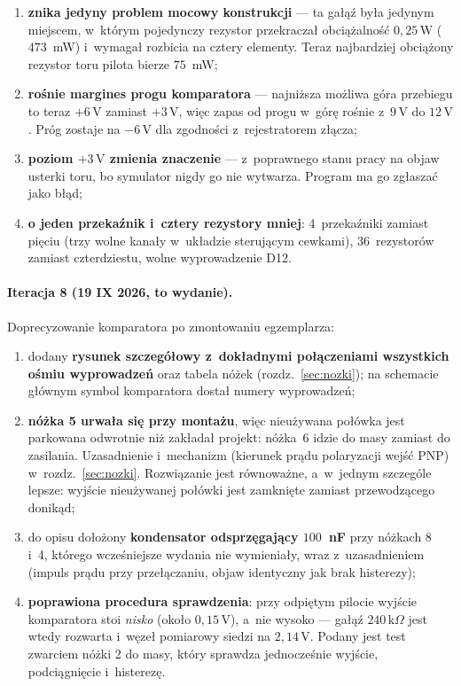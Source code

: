\documentclass[a4paper,11pt]{article}
\newcommand{\kohm}{\,\mathrm{k}\Omega}
\newcommand{\volt}{\,\mathrm{V}}
\newcommand{\watt}{\,\mathrm{W}}
\begin{document}
\begin{enumerate}
\item \textbf{znika jedyny problem mocowy konstrukcji} --- ta gałąź była jedynym
      miejscem, w~którym pojedynczy rezystor przekraczał obciążalność
      $0{,}25\watt$ ($473$~mW) i~wymagał rozbicia na cztery elementy. Teraz
      najbardziej obciążony rezystor toru pilota bierze $75$~mW;
\item \textbf{rośnie margines progu komparatora} --- najniższa możliwa góra
      przebiegu to teraz $+6\volt$ zamiast $+3\volt$, więc zapas od progu w~górę
      rośnie z~$9\volt$ do $12\volt$. Próg zostaje na $-6\volt$ dla zgodności
      z~rejestratorem złącza;
\item \textbf{poziom $+3\volt$ zmienia znaczenie} --- z~poprawnego stanu pracy na
      objaw usterki toru, bo symulator nigdy go nie wytwarza. Program ma go zgłaszać
      jako błąd;
\item \textbf{o jeden przekaźnik i~cztery rezystory mniej}: 4~przekaźniki zamiast
      pięciu (trzy wolne kanały w~układzie sterującym cewkami), 36~rezystorów
      zamiast czterdziestu, wolne wyprowadzenie D12.
\end{enumerate}

\paragraph{Iteracja 8 (19 IX 2026, to wydanie).} Doprecyzowanie komparatora po
zmontowaniu egzemplarza:

\begin{enumerate}
\item dodany \textbf{rysunek szczegółowy z~dokładnymi połączeniami wszystkich ośmiu
      wyprowadzeń} oraz tabela nóżek (rozdz.~\ref{sec:nozki}); na schemacie głównym
      symbol komparatora dostał numery wyprowadzeń;
\item \textbf{nóżka 5 urwała się przy montażu}, więc nieużywana połówka jest parkowana
      odwrotnie niż zakładał projekt: nóżka~6 idzie do masy zamiast do zasilania.
      Uzasadnienie i~mechanizm (kierunek prądu polaryzacji wejść PNP)
      w~rozdz.~\ref{sec:nozki}. Rozwiązanie jest równoważne, a~w~jednym szczególe
      lepsze: wyjście nieużywanej połówki jest zamknięte zamiast przewodzącego
      donikąd;
\item do opisu dołożony \textbf{kondensator odsprzęgający $100$~nF} przy nóżkach 8
      i~4, którego wcześniejsze wydania nie wymieniały, wraz z~uzasadnieniem
      (impuls prądu przy przełączaniu, objaw identyczny jak brak histerezy);
\item \textbf{poprawiona procedura sprawdzenia}: przy odpiętym pilocie wyjście
      komparatora stoi \emph{nisko} (około $0{,}15\volt$), a~nie wysoko --- gałąź
      $240\kohm$ jest wtedy rozwarta i~węzeł pomiarowy siedzi na $2{,}14\volt$.
      Podany jest test zwarciem nóżki 2 do masy, który sprawdza jednocześnie
      wyjście, podciągnięcie i~histerezę.
\end{enumerate}
\end{document}
